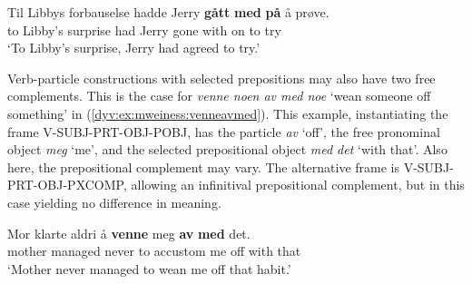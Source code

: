 \documentclass[output=paper]{langsci/langscibook}
\begin{document}
\ea\label{dyv:ex:mweiness:gåmedpå-3}
\gll   Til Libbys forbauselse hadde Jerry \textbf{gått} \textbf{med} \textbf{på} å prøve. \\
        to Libby's surprise had Jerry gone with on to try \\
\glt `To Libby's surprise, Jerry had agreed to try.' \\
\z




Verb-particle constructions with selected prepositions may also have two free complements. 
This is the case for \emph{venne noen av med noe} `wean someone off something' in (\ref{dyv:ex:mweiness:venneavmed}).
This example, instantiating the frame V-SUBJ-PRT-OBJ-POBJ, has the particle \emph{av} `off', the free pronominal object \emph{meg} `me', and the selected prepositional object \emph{med det} `with that'.
Also here, the prepositional complement may vary.
The alternative frame is V-SUBJ-PRT-OBJ-PXCOMP, allowing an infinitival prepositional complement, but in this case yielding no difference in meaning.

\ea\label{dyv:ex:mweiness:venneavmed}
\gll   Mor klarte aldri å \textbf{venne} meg \textbf{av} \textbf{med} det. \\
         mother managed never to accustom me off with that \\
\glt `{Mother} never managed to wean me off that habit.' \\
\z

\end{document}
